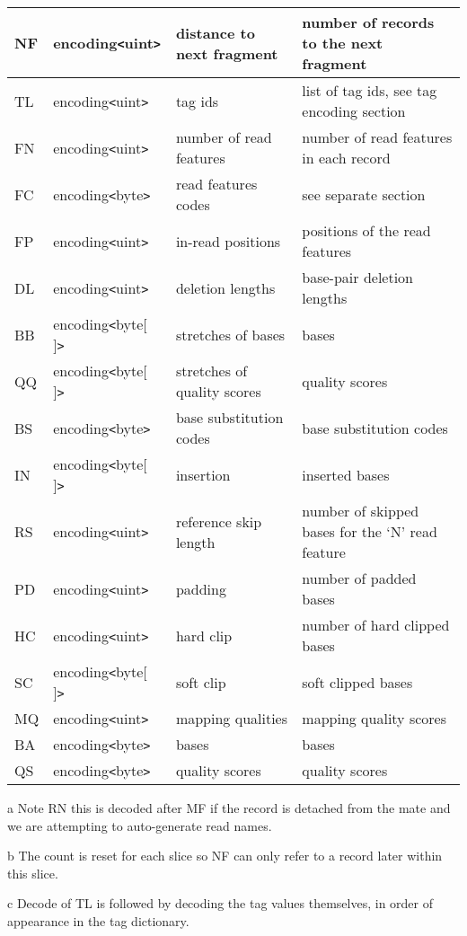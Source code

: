 \documentclass[a4paper]{article}
\begin{document}
\begin{threeparttable}[t]
\begin{tabular}{|l|l|>{\raggedright}p{100pt}|>{\raggedright}p{220pt}|}
\hline
NF & encoding\texttt{<}uint\texttt{>} & distance to next fragment & number of records
to the next fragment\tnote{b}\tabularnewline
\hline
TL\tnote{c} & encoding\texttt{<}uint\texttt{>} & tag ids  & list of tag ids, see tag encoding
section\tabularnewline
\hline
FN & encoding\texttt{<}uint\texttt{>} & number of read features & number of read
features in each record\tabularnewline
\hline
FC & encoding\texttt{<}byte\texttt{>} & read features codes & see separate section\tabularnewline
\hline
FP & encoding\texttt{<}uint\texttt{>} & in-read positions & positions of the read
features\tabularnewline
\hline
DL & encoding\texttt{<}uint\texttt{>} & deletion lengths & base-pair deletion lengths\tabularnewline
\hline
BB & encoding\texttt{<}byte[ ]\texttt{>} & stretches of bases & bases\tabularnewline
\hline
QQ & encoding\texttt{<}byte[ ]\texttt{>} & stretches of quality scores & quality scores\tabularnewline
\hline
BS & encoding\texttt{<}byte\texttt{>} & base substitution codes & base substitution
codes\tabularnewline
\hline
IN & encoding\texttt{<}byte[ ]\texttt{>} & insertion & inserted bases\tabularnewline
\hline
RS & encoding\texttt{<}uint\texttt{>} & reference skip length & number of skipped 
bases for the `N' read feature\tabularnewline
\hline
PD & encoding\texttt{<}uint\texttt{>} & padding & number of padded bases\tabularnewline
\hline
HC & encoding\texttt{<}uint\texttt{>} & hard clip & number of hard clipped bases\tabularnewline
\hline
SC & encoding\texttt{<}byte[ ]\texttt{>} & soft clip & soft clipped bases\tabularnewline
\hline
MQ & encoding\texttt{<}uint\texttt{>} & mapping qualities & mapping quality scores\tabularnewline
\hline
BA & encoding\texttt{<}byte\texttt{>} & bases & bases\tabularnewline
\hline
QS & encoding\texttt{<}byte\texttt{>} & quality scores & quality scores\tabularnewline
\hline
\end{tabular}

\begin{tablenotes}
\item[a] Note RN this is decoded after MF if the record is detached from the mate and we are attempting to auto-generate read names.
\item[b] The count is reset for each slice so NF can only refer to a record later within this slice.
\item[c] Decode of TL is followed by decoding the tag values themselves, in order of appearance in the tag dictionary.
\end{tablenotes}
\end{threeparttable}
\end{document}
